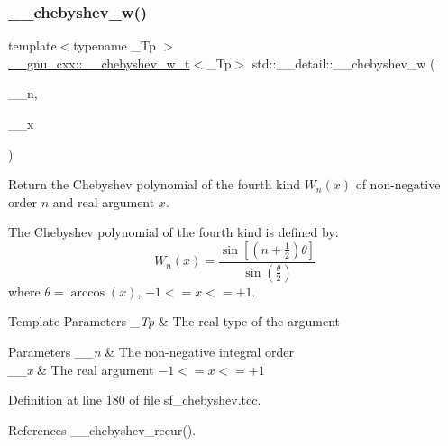 \subsubsection{\texorpdfstring{\+\_\+\+\_\+chebyshev\+\_\+w()}{\_\_chebyshev\_w()}}
{\footnotesize\ttfamily template$<$typename \+\_\+\+Tp $>$ \\
\hyperlink{struct____gnu__cxx_1_1____chebyshev__w__t}{\+\_\+\+\_\+gnu\+\_\+cxx\+::\+\_\+\+\_\+chebyshev\+\_\+w\+\_\+t}$<$\+\_\+\+Tp$>$ std\+::\+\_\+\+\_\+detail\+::\+\_\+\+\_\+chebyshev\+\_\+w (\begin{DoxyParamCaption}\item[{unsigned int}]{\+\_\+\+\_\+n,  }\item[{\+\_\+\+Tp}]{\+\_\+\+\_\+x }\end{DoxyParamCaption})}

Return the Chebyshev polynomial of the fourth kind $ W_n(x) $ of non-\/negative order $ n $ and real argument $ x $.

The Chebyshev polynomial of the fourth kind is defined by\+: \[ W_n(x) = \frac{\sin \left[ \left(n+\frac{1}{2}\right)\theta \right]} {\sin \left(\frac{\theta}{2}\right)} \] where $ \theta = \arccos(x) $, $ -1 <= x <= +1 $.


\begin{DoxyTemplParams}{Template Parameters}
{\em \+\_\+\+Tp} & The real type of the argument \\
\hline
\end{DoxyTemplParams}

\begin{DoxyParams}{Parameters}
{\em \+\_\+\+\_\+n} & The non-\/negative integral order \\
\hline
{\em \+\_\+\+\_\+x} & The real argument $ -1 <= x <= +1 $ \\
\hline
\end{DoxyParams}


Definition at line 180 of file sf\+\_\+chebyshev.\+tcc.



References \+\_\+\+\_\+chebyshev\+\_\+recur().

\mbox{\label{namespacestd_1_1____detail_a2125cbbc3fd3aad11c8025478c7a14fe}} 
